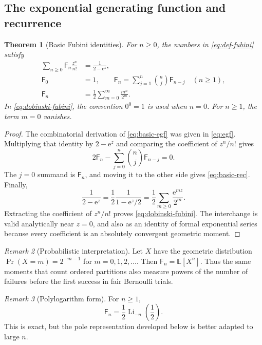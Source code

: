 \documentclass[11pt,a4paper]{article}
\newtheorem{theorem}{Theorem}[section]
\theoremstyle{definition}
\theoremstyle{remark}
\newtheorem{remark}[theorem]{Remark}
\newcommand{\Fub}{\mathsf F}
\newcommand{\e}{\mathrm e}
\newcommand{\Li}{\operatorname{Li}}
\begin{document}
\subsection{The exponential generating function and recurrence}

\begin{theorem}[Basic Fubini identities]\label{thm:basic}
For \(n\ge0\), the numbers in \eqref{eq:def-fubini} satisfy
\begin{align}
 \sum_{n\ge0}\Fub_n\frac{z^n}{n!}&=\frac1{2-\e^z},
 \label{eq:basic-egf}\\
 \Fub_0&=1,\qquad
 \Fub_n=\sum_{j=1}^n\binom nj\Fub_{n-j}\quad(n\ge1),
 \label{eq:basic-rec}\\
 \Fub_n&=\frac12\sum_{m=0}^{\infty}\frac{m^n}{2^m}.
 \label{eq:dobinski-fubini}
\end{align}
In \eqref{eq:dobinski-fubini}, the convention \(0^0=1\) is used when \(n=0\).
For \(n\ge1\), the term \(m=0\) vanishes.
\end{theorem}

\begin{proof}
The combinatorial derivation of \eqref{eq:basic-egf} was given in
\eqref{eq:egf}.  Multiplying that identity by \(2-\e^z\) and comparing the
coefficient of \(z^n/n!\) gives
\[
 2\Fub_n-\sum_{j=0}^n\binom nj\Fub_{n-j}=0.
\]
The \(j=0\) summand is \(\Fub_n\), and moving it to the other side gives
\eqref{eq:basic-rec}.  Finally,
\[
 \frac1{2-\e^z}
 =\frac12\frac1{1-\e^z/2}
 =\frac12\sum_{m\ge0}\frac{\e^{mz}}{2^m}.
\]
Extracting the coefficient of \(z^n/n!\) proves
\eqref{eq:dobinski-fubini}.  The interchange is valid analytically near
\(z=0\), and also as an identity of formal exponential series because every
coefficient is an absolutely convergent geometric moment.
\end{proof}

\begin{remark}[Probabilistic interpretation]
Let \(X\) have the geometric distribution
\(
 \Pr(X=m)=2^{-m-1}
\) for \(m=0,1,2,\ldots\).  Then
\(
 \Fub_n=\mathbb E[X^n]
\).
Thus the same moments that count ordered partitions also measure powers of the
number of failures before the first success in fair Bernoulli trials.
\end{remark}

\begin{remark}[Polylogarithm form]
For \(n\ge1\),
\begin{equation}\label{eq:polylog}
 \Fub_n=\frac12\Li_{-n}\!\left(\frac12\right).
\end{equation}
This is exact, but the pole representation developed below is better adapted to
large \(n\).
\end{remark}
\end{document}
